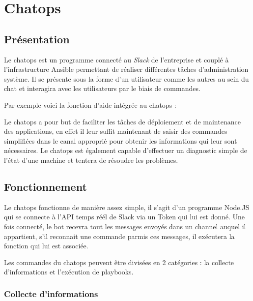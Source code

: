 \documentclass[11pt,a4paper]{article}
\begin{document}
  \newpage

  \section{Chatops}\label{chatops}

  \subsection{Présentation}\label{pruxe9sentation-1}

  Le chatops est un programme connecté au \emph{Slack} de l'entreprise et
  couplé à l'infrastructure Ansible permettant de réaliser différentes
  tâches d'administration système. Il se présente sous la forme d'un
  utilisateur comme les autres au sein du chat et interagira avec les
  utilisateurs par le biais de commandes.

  \bigskip

  Par exemple voici la fonction d'aide intégrée au chatops :

  \bigskip

  Le chatops a pour but de faciliter les tâches de déploiement et de
  maintenance des applications, en effet il leur suffit maintenant de
  saisir des commandes simplifiées dans le canal approprié pour obtenir
  les informations qui leur sont nécessaires. Le chatops est également
  capable d'effectuer un diagnostic simple de l'état d'une machine et
  tentera de résoudre les problèmes.

  \newpage

  \subsection{Fonctionnement}\label{fonctionnement}

  Le chatops fonctionne de manière assez simple, il s'agit d'un programme
  Node.JS qui se connecte à l'API temps réél de Slack via un Token qui lui
  est donné. Une fois connecté, le bot recevra tout les messages envoyés
  dans un channel auquel il appartient, s'il reconnait une commande parmis
  ces messages, il exécutera la fonction qui lui est associée.

  Les commandes du chatops peuvent être divisées en 2 catégories : la
  collecte d'informations et l'exécution de playbooks.

  \subsubsection{Collecte d'informations}\label{collecte-dinformations}
\end{document}
